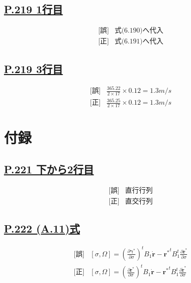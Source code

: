 \documentclass[9pt,fleqn]{bxjsarticle}
\begin{document}
\subsection*{\underline{P.219 1行目}}
\begin{align*}
    &\text{[誤]} \hspace{10pt} \text{式(6.190)へ代入} \\
    &\text{[正]} \hspace{10pt} \text{式(6.191)へ代入}
\end{align*}

\subsection*{\underline{P.219 3行目}}
\begin{align*}
    &\text{[誤]} \hspace{10pt} \frac{365.22}{2\times17}\times0.12 = 1.3 m/s \\
    &\text{[正]} \hspace{10pt} \frac{365.25}{2\times17}\times0.12 = 1.3 m/s 
\end{align*}


\section*{付録}

\subsection*{\underline{P.221 下から2行目}}
\begin{align*}
    &\text{[誤]} \hspace{10pt} \text{直行行列} \\
    &\text{[正]} \hspace{10pt} \text{直交行列}  
\end{align*}

\subsection*{\underline{P.222 (A.11)式}}
\begin{align*}
    &\text{[誤]} \hspace{10pt} [\sigma,\Omega] = \left(\frac{\partial\bm{\gamma}^*}{\partial\sigma}\right)^t B_1\dot{\bm{r}}-{\bm{r}^*}^tB_1^t\frac{\partial\dot{\bm{r}}^*}{\partial\sigma} \\
    &\text{[正]} \hspace{10pt} [\sigma,\Omega] = \left(\frac{\partial\bm{r}^*}{\partial\sigma}\right)^t B_1\dot{\bm{r}}-{\bm{r}^*}^tB_1^t\frac{\partial\dot{\bm{r}}^*}{\partial\sigma}
\end{align*}
\end{document}
